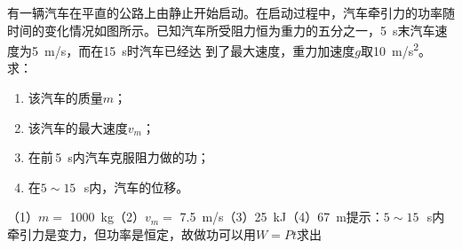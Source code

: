 有一辆汽车在平直的公路上由静止开始启动。在启动过程中，汽车牵引力的功率随时间的变化情况如图所示。已知汽车所受阻力恒为重力的五分之一，\qty{5}{s}末汽车速度为\qty{5}{m/s}，而在\qty{15}{s}时汽车已经达	到了最大速度，重力加速度\(g\)取\qty{10}{m/s^2}。求：
\begin{enumerate}
	\item 该汽车的质量\(m\)；
	\item 该汽车的最大速度\(v_m\)；
	\item 在前\,\qty{5}{s}内汽车克服阻力做的功；
	\item 在\(5\sim15\)\,\qty{}{s}内，汽车的位移。
\end{enumerate}
\begin{answer}
    （1）\(m =\) \qty{1000}{kg}（2）\(v_m =\) \qty{7.5}{m/s}（3）\qty{25}{kJ}（4）\qty{67}{m}\qquad 提示：\(5\sim15\)\,\qty{}{s}内牵引力是变力，但功率是恒定，故做功可以用\(W = Pt\)求出
\end{answer}